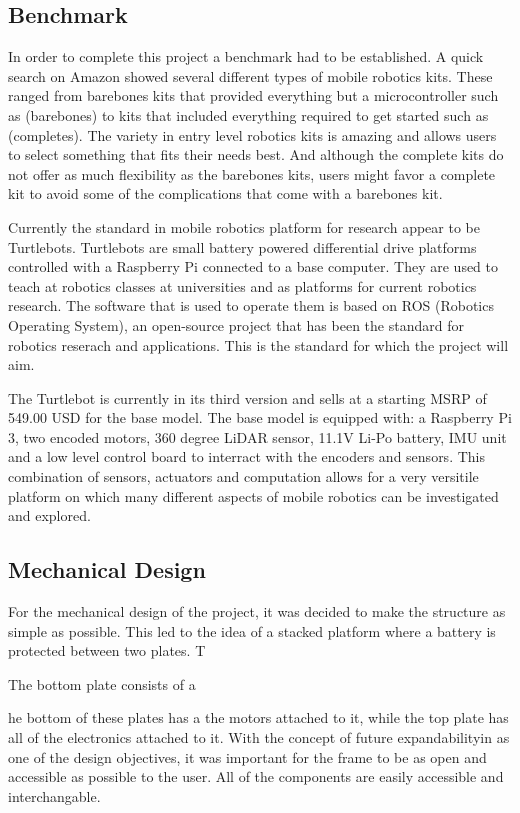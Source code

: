 \documentclass[12pt, letterpaper,titlepage]{article}
\begin{document}
\subsection{Benchmark}

	In order to complete this project a benchmark had to be established. A quick search on Amazon showed several different types of mobile robotics kits. These ranged from barebones kits that provided everything but a microcontroller such as (barebones) to kits that included everything required to get started such as (completes). The variety in entry level robotics kits is amazing and allows users to select something that fits their needs best. And although the complete kits do not offer as much flexibility as the barebones kits, users might favor a complete kit to avoid some of the complications that come with a barebones kit. 

	Currently the standard in mobile robotics platform for research appear to be Turtlebots. Turtlebots are small battery powered differential drive platforms controlled with a Raspberry Pi connected to a base computer. They are used to teach at robotics classes at universities and as platforms for current robotics research. The software that is used to operate them is based on ROS (Robotics Operating System), an open-source project that has been the standard for robotics reserach and applications. This is the standard for which the project will aim.

	The Turtlebot is currently in its third version and sells at a starting MSRP of 549.00 USD for the base model. The base model is equipped with: a Raspberry Pi 3, two encoded motors, 360 degree LiDAR sensor, 11.1V Li-Po battery, IMU unit and a low level control board to interract with the encoders and sensors. This combination of sensors, actuators and computation allows for a very versitile platform on which many different aspects of mobile robotics can be investigated and explored.

\subsection{Mechanical Design}

	For the mechanical design of the project, it was decided to make the structure as simple as possible. This led to the idea of a stacked platform where a battery is protected between two plates. T
	
	The bottom plate consists of a 
	
	he bottom of these plates has a the motors attached to it, while the top plate has all of the electronics attached to it. With the concept of future expandabilityin as one of the design objectives, it was important for the frame to be as open and accessible as possible to the user. All of the components are easily accessible and interchangable. 
\end{document}
